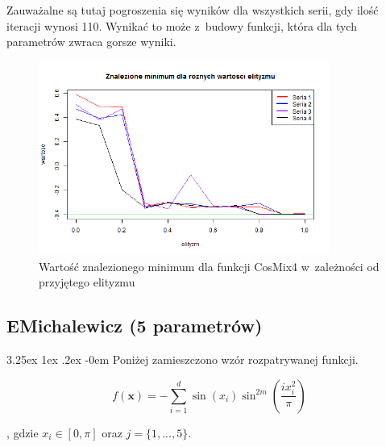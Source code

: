 \documentclass[11pt, a4paper]{article}
\makeatletter
\newcommand{\fbi}{\leavevmode{\parindent=1em\indent}}
\renewcommand\paragraph{\@startsection{paragraph}{5}{\z@}
  {3.25ex \@plus1ex \@minus.2ex}
  {-0em}
  {\normalfont\normalsize\bfseries}}
\makeatother
\begin{document}
\fbi
Zauważalne są tutaj pogroszenia się wyników dla wszystkich serii, gdy ilość iteracji wynosi 110. Wynikać to może z~budowy funkcji, która dla tych parametrów zwraca gorsze wyniki.

\begin{figure}[H]
	\begin{center}
		\includegraphics[width=0.85\textwidth]{./assets/CosMix46.png}
		\caption{Wartość znalezionego minimum dla funkcji CosMix4 w~zależności od przyjętego elityzmu}
		\label{fig:cosmix46}
	\end{center}
\end{figure}

\newpage
\subsection{EMichalewicz (5 parametrów)}
\paragraph{}
Poniżej zamieszczono wzór rozpatrywanej funkcji.

\begin{equation}\label{eq:emichalewicz}
f(\boldsymbol{x}) = - \sum_{i=1}^{d} \sin(x_i) \sin^{2m} (\frac{i x_i^2}{\pi})
\end{equation}

, gdzie $ x_i \in [0, \pi]$ oraz $j = \{1, ..., 5\}$.
\end{document}
